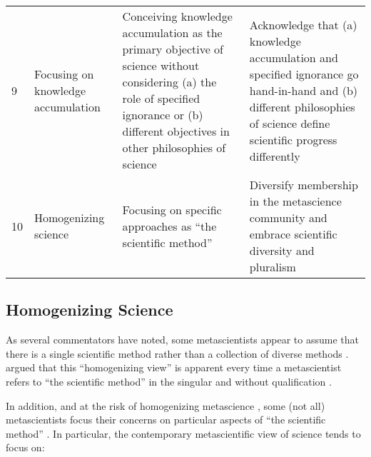 \documentclass[authordate, meta, issue]{jote-new-article}
\begin{document}
\begin{table*}
\begin{fullwidth}
\begin{tabularx}{\linewidth}{@{} l >{\RaggedRight\arraybackslash}p{12em} >{\RaggedRight\arraybackslash}X >{\RaggedRight\arraybackslash}X@{}}
      9  & Focusing on knowledge accumulation                                                                                                                                                                                                      & Conceiving knowledge accumulation as the primary objective of science without considering (a) the role of specified ignorance or (b) different objectives in other philosophies of science
         & Acknowledge that (a) knowledge accumulation and specified ignorance go hand-in-hand and (b) different philosophies of science define scientific progress differently
      \\

      10 & Homogenizing science                                                                                                                                                                                                                    & Focusing on specific approaches as “the scientific method”
         & Diversify membership in the metascience community and embrace scientific diversity and pluralism
      \\
      \bottomrule
    \end{tabularx}
  \end{fullwidth}
\end{table*}




\subsection{Homogenizing Science}



As several commentators have noted, some metascientists appear to assume that there is a single scientific method rather than a collection of diverse methods \parencites[for commentators, see][]{Drummond2019}{Malich2022}[p. 21]{Peterson2020}[see also][p. 2]{Guttinger2020}. \textcite[pp. 4-6]{Malich2022} argued that this “homogenizing view” is apparent every time a metascientist refers to “the scientific method” in the singular and without qualification \parencites[e.g.,][p. 7]{Munafò2017}[p. 618]{Nosek2012}[p. 13]{Zwaan2018}[for further examples, see][p. 64]{Drummond2019}.



In addition, and at the risk of homogenizing metascience \parencites{Field2022}, some (not all) metascientists focus their concerns on particular aspects of “the scientific method” \parencite{Flis2019}. In particular, the contemporary metascientific view of science tends to focus on:
\end{document}
